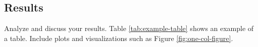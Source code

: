 \subsection{Results}
Analyze and discuss your results. Table \ref{tab:example-table} shows an example of a table.
Include plots and visualizations such as Figure \ref{fig:one-col-figure}.

